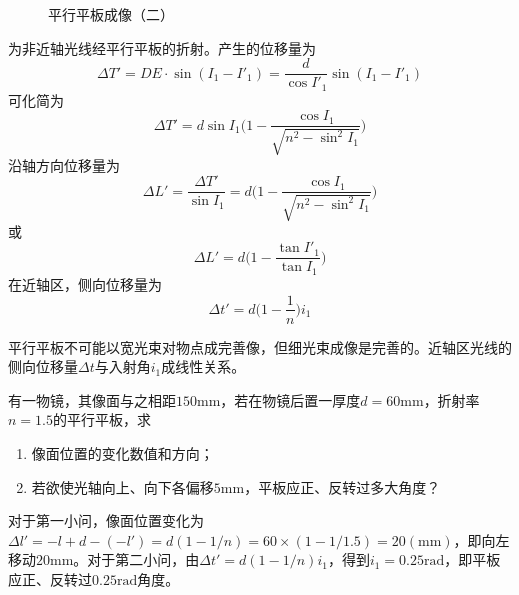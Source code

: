 \documentclass[cn,10pt,chinesefont=founder,math=mtpro2,cite=super,toc=onecol,twoside,openany]{elegantbook}
\begin{document}
\begin{figure}[htbp]
\begin{minipage}[t]{0.48\textwidth}
		\caption{平行平板成像（二）}
		\label{fig:parallel-plate-2}
	\end{minipage}
\end{figure}

 为非近轴光线经平行平板的折射。产生的位移量为
\begin{equation}
\Delta T'=DE\cdot\sin(I_1-I'_1)=\frac{d}{\cos{I'_1}}\sin(I_1-I'_1)
\end{equation}
可化简为
\begin{equation}
\Delta T'=d\sin I_1\bigg(1-\frac{\cos I_1}{\sqrt{n^2-\sin^2 I_1}}\bigg)
\end{equation}
沿轴方向位移量为
\begin{equation}
\Delta L'=\frac{\Delta T'}{\sin I_1}=d\bigg(1-\frac{\cos I_1}{\sqrt{n^2-\sin^2 I_1}}\bigg)
\end{equation}
或
\begin{equation}
\Delta L'=d\bigg(1-\frac{\tan I'_1}{\tan I_1}\bigg)
\end{equation}
在近轴区，侧向位移量为
\begin{equation}
\Delta t'=d\bigg(1-\frac{1}{n}\bigg)i_1
\end{equation}

\begin{note}
	平行平板不可能以宽光束对物点成完善像，但细光束成像是完善的。近轴区光线的侧向位移量$\Delta t$与入射角$i_1$成线性关系。
\end{note}

\begin{problem}
	有一物镜，其像面与之相距$150\mathrm{mm}$，若在物镜后置一厚度$d=60\mathrm{mm}$，折射率$n=1.5$的平行平板，求
	\begin{enumerate}
		\item 像面位置的变化数值和方向；
		\item 若欲使光轴向上、向下各偏移$5\mathrm{mm}$，平板应正、反转过多大角度？
	\end{enumerate}
\end{problem}
\begin{solution}
	对于第一小问，像面位置变化为$\Delta l'=-l+d-(-l')=d(1-1/n)=60\times(1-1/1.5)=20(\mathrm{mm})$，即向左移动$20\mathrm{mm}$。对于第二小问，由$\Delta t'=d(1-1/n)i_1$，得到$i_1=0.25\mathrm{rad}$，即平板应正、反转过$0.25\mathrm{rad}$角度。
\end{solution}
\end{document}
